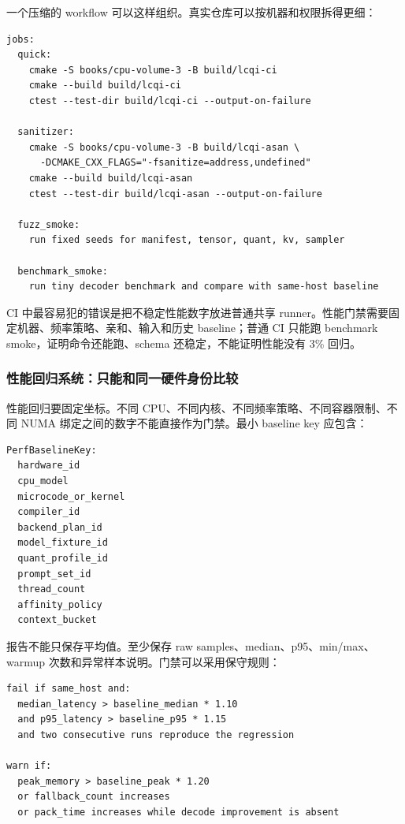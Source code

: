一个压缩的 workflow 可以这样组织。真实仓库可以按机器和权限拆得更细：

\begin{lstlisting}[numbers=none,caption={CI workflow 形态草图}]
jobs:
  quick:
    cmake -S books/cpu-volume-3 -B build/lcqi-ci
    cmake --build build/lcqi-ci
    ctest --test-dir build/lcqi-ci --output-on-failure

  sanitizer:
    cmake -S books/cpu-volume-3 -B build/lcqi-asan \
      -DCMAKE_CXX_FLAGS="-fsanitize=address,undefined"
    cmake --build build/lcqi-asan
    ctest --test-dir build/lcqi-asan --output-on-failure

  fuzz_smoke:
    run fixed seeds for manifest, tensor, quant, kv, sampler

  benchmark_smoke:
    run tiny decoder benchmark and compare with same-host baseline
\end{lstlisting}

CI 中最容易犯的错误是把不稳定性能数字放进普通共享 runner。性能门禁需要固定机器、频率策略、亲和、输入和历史 baseline；普通 CI 只能跑 benchmark smoke，证明命令还能跑、schema 还稳定，不能证明性能没有 3\% 回归。

\subsubsection{性能回归系统：只能和同一硬件身份比较}

性能回归要固定坐标。不同 CPU、不同内核、不同频率策略、不同容器限制、不同 NUMA 绑定之间的数字不能直接作为门禁。最小 baseline key 应包含：

\begin{lstlisting}[numbers=none,caption={性能 baseline key}]
PerfBaselineKey:
  hardware_id
  cpu_model
  microcode_or_kernel
  compiler_id
  backend_plan_id
  model_fixture_id
  quant_profile_id
  prompt_set_id
  thread_count
  affinity_policy
  context_bucket
\end{lstlisting}

报告不能只保存平均值。至少保存 raw samples、median、p95、min/max、warmup 次数和异常样本说明。门禁可以采用保守规则：

\begin{lstlisting}[numbers=none,caption={性能回归判定规则示例}]
fail if same_host and:
  median_latency > baseline_median * 1.10
  and p95_latency > baseline_p95 * 1.15
  and two consecutive runs reproduce the regression

warn if:
  peak_memory > baseline_peak * 1.20
  or fallback_count increases
  or pack_time increases while decode improvement is absent
\end{lstlisting}

